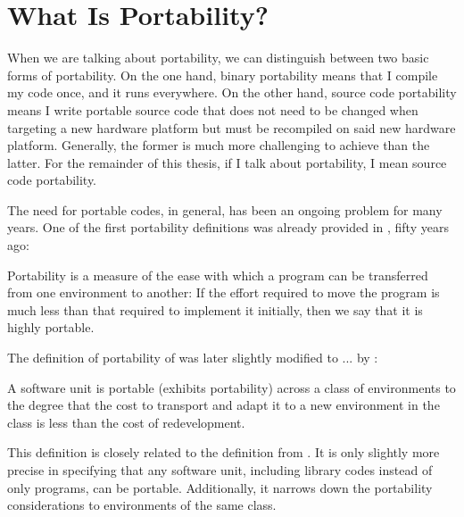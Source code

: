 \section{What Is Portability?}
\label{sec::portability}

When we are talking about portability, we can distinguish between two basic forms of portability. 
On the one hand, binary portability means that I compile my code once, and it runs everywhere. 
On the other hand, source code portability means I write portable source code that does not need to be changed when targeting a new hardware platform but must be recompiled on said new hardware platform. 
Generally, the former is much more challenging to achieve than the latter. %
For the remainder of this thesis, if I talk about portability, I mean source code portability. 

The need for portable codes, in general, has been an ongoing problem for many years. 
One of the first portability definitions was already provided in \citeyear{poole_portability_1975}, fifty years ago: 
\begin{quotebox}{\citet{poole_portability_1975}}
    Portability is a measure of the ease with which a program can be transferred from one environment to another: If the effort required to move the program is much less than that required to implement it initially, then we say that it is highly portable.
\end{quotebox}

The definition of portability of \citet{poole_portability_1975} was later slightly modified to ... by \citet{mooney_strategies_1990, mooney_bringing_1997}:
\begin{quotebox}{\citet{mooney_bringing_1997}}
    A software unit is portable (exhibits portability) across a class of environments to the degree that the cost to transport and adapt it to a new environment in the class is less than the cost of redevelopment. 
\end{quotebox}
This definition is closely related to the definition from \citet{poole_portability_1975}. 
It is only slightly more precise in specifying that any software unit, including library codes instead of only programs, can be portable. 
Additionally, it narrows down the portability considerations to environments of the same class.  


